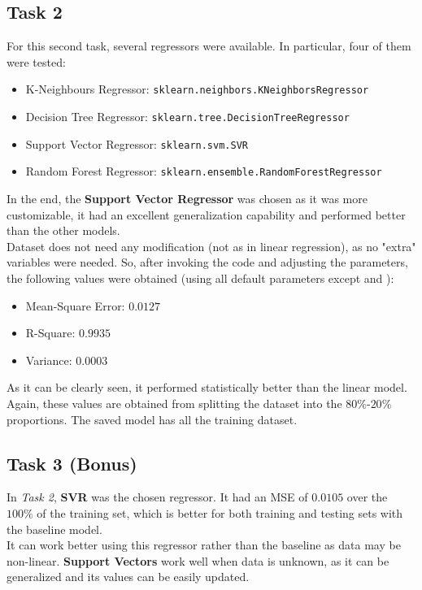 \documentclass[11pt]{scrartcl}
\begin{document}
    \subsection{Task 2}
    For this second task, several regressors were available. In particular, four of them were tested:
    \begin{itemize}
        \item K-Neighbours Regressor: \texttt{sklearn.neighbors.KNeighborsRegressor}
        \item Decision Tree Regressor: \texttt{sklearn.tree.DecisionTreeRegressor}
        \item Support Vector Regressor: \texttt{sklearn.svm.SVR}
        \item Random Forest Regressor: \texttt{sklearn.ensemble.RandomForestRegressor}
    \end{itemize}
    In the end, the \textbf{Support Vector Regressor} was chosen as it was more customizable, it had an excellent generalization capability and performed better than the other models.\\
    Dataset does not need any modification (not as in linear regression), as no "extra" variables were needed. So, after invoking the code and adjusting the parameters, the following values were obtained (using all default parameters except  and ):
    \begin{itemize}
        \item Mean-Square Error: $0.0127$
        \item R-Square: $0.9935$
        \item Variance: $0.0003$
    \end{itemize}
    As it can be clearly seen, it performed statistically better than the linear model. Again, these values are obtained from splitting the dataset into the $80\%$-$20\%$ proportions. The saved  model has all the training dataset.

    \subsection{Task 3 (Bonus)}
    In \textit{Task 2}, \textbf{SVR} was the chosen regressor. It had an MSE of $0.0105$ over the $100\%$ of the training set, which is better for both training and testing sets with the baseline model.\\
    It can work better using this regressor rather than the baseline as data may be non-linear. \textbf{Support Vectors} work well when data is unknown, as it can be generalized and its values can be easily updated.\\
\end{document}
